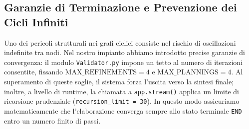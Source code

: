 \subsection{Garanzie di Terminazione e Prevenzione dei Cicli Infiniti}
Uno dei pericoli strutturali nei grafi ciclici consiste nel rischio di oscillazioni indefinite tra nodi. Nel nostro impianto abbiamo introdotto precise garanzie di convergenza: il modulo \texttt{Validator.py} impone un tetto al numero di iterazioni consentite, fissando $\text{MAX\_REFINEMENTS} = 4$ e $\text{MAX\_PLANNINGS} = 4$. Al superamento di queste soglie, il sistema forza l'uscita verso la sintesi finale; inoltre, a livello di runtime, la chiamata a \texttt{app.stream()} applica un limite di ricorsione prudenziale (\texttt{recursion\_limit = 30}). In questo modo assicuriamo matematicamente che l'elaborazione converga sempre allo stato terminale \texttt{END} entro un numero finito di passi.
